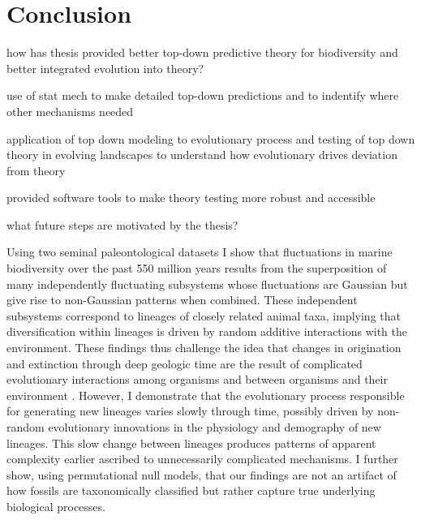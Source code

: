 \chapter*{Conclusion}

how has thesis provided better top-down predictive theory for
biodiversity and better integrated evolution into theory?

use of stat mech to make detailed top-down predictions and to
indentify where other mechanisms needed

application of top down modeling to evolutionary process and testing
of top down theory in evolving landscapes to understand how
evolutionary drives deviation from theory

provided software tools to make theory testing more robust and
accessible

what future steps are motivated by the thesis?



Using two seminal paleontological datasets \cite{sepkoski1992,
  alroy08} I show that fluctuations in marine biodiversity over the
past 550 million years results from the superposition of many
independently fluctuating subsystems whose fluctuations are Gaussian
but give rise to non-Gaussian patterns when combined.  These
independent subsystems correspond to lineages of closely related
animal taxa, implying that diversification within lineages is driven
by random additive interactions with the environment. These findings
thus challenge the idea that changes in origination and extinction
through deep geologic time are the result of complicated evolutionary
interactions among organisms and between organisms and their
environment \cite{bak1993, sole1997, newman1995}. However, I
demonstrate that the evolutionary process responsible for generating
new lineages varies slowly through time, possibly driven by non-random
evolutionary innovations in the physiology and demography of new
lineages. This slow change between lineages produces patterns of
apparent complexity earlier ascribed to unnecessarily complicated
mechanisms. I further show, using permutational null models, that our
findings are not an artifact of how fossils are taxonomically
classified but rather capture true underlying biological processes.







